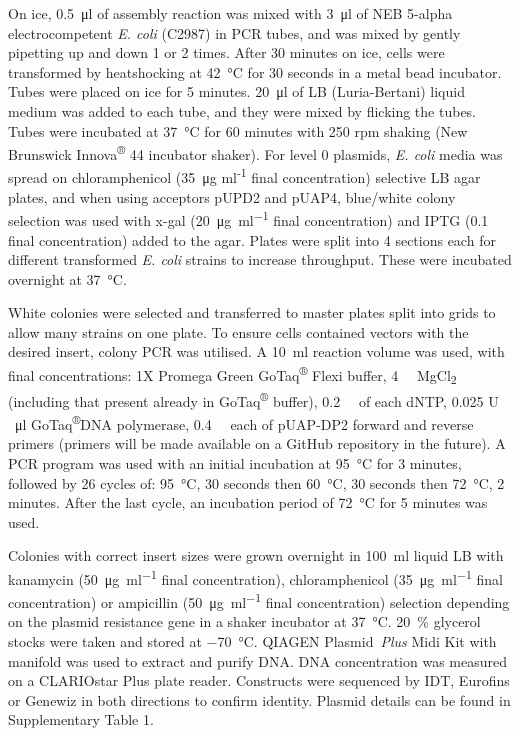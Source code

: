 \documentclass[../main.tex]{subfiles}
\begin{document}
On ice, \SI{0.5}{\micro\litre} of assembly reaction was mixed with \SI{3}{\micro\litre} of NEB 5-alpha electrocompetent \textit{E. coli} (C2987) in PCR tubes, and was mixed by gently pipetting up and down 1 or 2 times.
After 30 minutes on ice, cells were transformed by heatshocking at \SI{42}{\degreeCelsius} for 30 seconds in a metal bead incubator. Tubes were placed on ice for 5 minutes.
\SI{20}{\micro\litre} of LB (Luria-Bertani) liquid medium was added to each tube, and they were mixed by flicking the tubes.
Tubes were incubated at \SI{37}{\degreeCelsius} for 60 minutes with 250 rpm shaking (New Brunswick Innova\textsuperscript{®} 44 incubator shaker).
For level 0 plasmids, \textit{E. coli} media was spread on chloramphenicol (\SI{35}{\micro\gram} ml\textsuperscript{-1} final concentration) selective LB agar plates, and when using acceptors pUPD2 and pUAP4, blue/white colony selection was used with x-gal (\SI{20}{\micro\gram\per\ml} final concentration) and IPTG (\SI{0.1}{\milli\Molar} final concentration) added to the agar.
Plates were split into 4 sections each for different transformed \textit{E. coli} strains to increase throughput.
These were incubated overnight at \SI{37}{\degreeCelsius}.

White colonies were selected and transferred to master plates split into grids to allow many strains on one plate.
To ensure cells contained vectors with the desired insert, colony PCR was utilised.
A \SI{10}{\ml} reaction volume was used, with final concentrations: 1X Promega Green GoTaq\textsuperscript{®} Flexi buffer, \SI{4}{\milli\Molar} MgCl\textsubscript{2} (including that present already in GoTaq\textsuperscript{®} buffer), \SI{0.2}{\milli\Molar} of each dNTP, 0.025 U \si{\per\micro\litre} GoTaq\textsuperscript{®}DNA polymerase, \SI{0.4}{\milli\Molar} each of pUAP\hyp{}DP2 forward and reverse primers (primers will be made available on a GitHub repository in the future).
A PCR program was used with an initial incubation at \SI{95}{\degreeCelsius} for 3 minutes, followed by 26 cycles of: \SI{95}{\degreeCelsius}, 30 seconds then \SI{60}{\degreeCelsius}, 30 seconds then \SI{72}{\degreeCelsius}, 2 minutes.
After the last cycle, an incubation period of \SI{72}{\degreeCelsius} for 5 minutes was used.

Colonies with correct insert sizes were grown overnight in \SI{100}{\ml} liquid LB with kanamycin (\SI{50}{\micro\gram\per\ml} final concentration), chloramphenicol (\SI{35}{\micro\gram\per\ml} final concentration) or ampicillin (\SI{50}{\micro\gram\per\ml} final concentration) selection depending on the plasmid resistance gene in a shaker incubator at \SI{37}{\degreeCelsius}.
\SI{20}{\percent} glycerol stocks were taken and stored at \SI{-70}{\degreeCelsius}.
QIAGEN Plasmid~\textit{Plus} Midi Kit with manifold was used to extract and purify DNA.
DNA concentration was measured on a CLARIOstar Plus plate reader.
Constructs were sequenced by IDT, Eurofins or Genewiz in both directions to confirm identity.
Plasmid details can be found in {Supplementary Table 1}.
\end{document}
